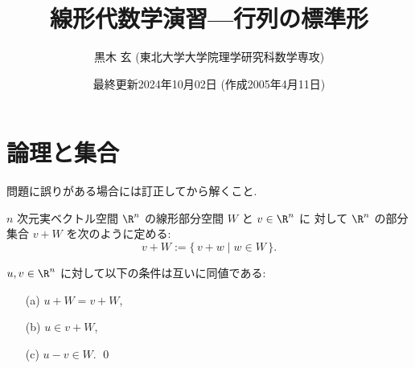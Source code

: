 \documentclass[12pt,twoside]{jarticle}
\begin{document}

\title{\bf 線形代数学演習---行列の標準形
  }

\author{黒木 玄 \quad (東北大学大学院理学研究科数学専攻)}

\date{最終更新2024年10月02日 \quad (作成2005年4月11日)}

\maketitle

\tableofcontents


\section{論理と集合}

問題に誤りがある場合には訂正してから解くこと.


$n$ 次元実ベクトル空間 $\R^n$ の線形部分空間 $W$ と $v\in\R^n$ に
対して $\R^n$ の部分集合 $v+W$ を次のように定める:
\begin{equation*}
  v + W := \{\, v+w \mid w\in W \,\}.
\end{equation*}

\begin{question}[10点]
  $u,v \in\R^n$ に対して以下の条件は互いに同値である:
  \begin{itemize}
  \item[(a)] $u+W = v+W$,
  \item[(b)] $u \in v+W$,
  \item[(c)] $u-v \in W$.
    \qed
  \end{itemize}
\end{question}
\end{document}
